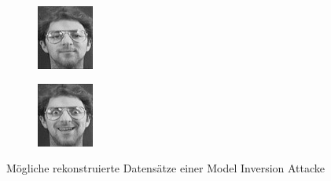 \begin{figure}[!htb]
\begin{subfigure}[h]{0.18\textwidth}
  \includegraphics[width=\linewidth]{figures/att/65_7.jpg}
\end{subfigure}
\begin{subfigure}[h]{0.18\textwidth}
  \centering
  \includegraphics[width=\linewidth]{figures/att/70_7.jpg}
\end{subfigure}
\caption{Mögliche rekonstruierte Datensätze einer Model Inversion Attacke \cite{P-3} \cite{att}}
\label{fig:model_inversion_example}
\end{figure}

